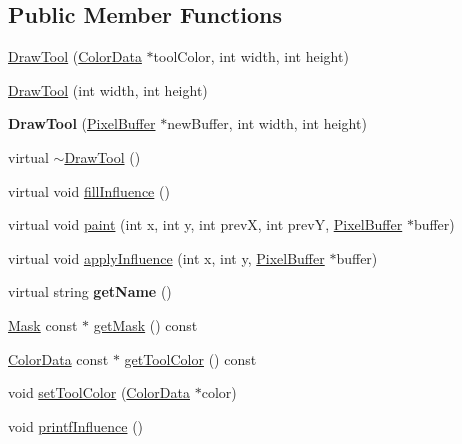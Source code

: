 \subsection*{Public Member Functions}
\begin{DoxyCompactItemize}
\item 
\hyperlink{classDrawTool_aa21e3a5373ba9e4e43d6e56eec82b32d}{Draw\-Tool} (\hyperlink{classColorData}{Color\-Data} $\ast$tool\-Color, int width, int height)
\item 
\hyperlink{classDrawTool_aa1816d6699a835d9c7619ee5c97be9d1}{Draw\-Tool} (int width, int height)
\item 
\hypertarget{classDrawTool_a521ad2f183dd3354de1dd163140e8b1d}{{\bfseries Draw\-Tool} (\hyperlink{classPixelBuffer}{Pixel\-Buffer} $\ast$new\-Buffer, int width, int height)}\label{classDrawTool_a521ad2f183dd3354de1dd163140e8b1d}

\item 
virtual \hyperlink{classDrawTool_ac07eb21dc6dfc99b7e3e7a6e3b9548f3}{$\sim$\-Draw\-Tool} ()
\item 
virtual void \hyperlink{classDrawTool_ae202bc193ba721452e81f34b6c2e6e35}{fill\-Influence} ()
\item 
virtual void \hyperlink{classDrawTool_a65dbb2f006efc9c6053d01df75eff5a9}{paint} (int x, int y, int prev\-X, int prev\-Y, \hyperlink{classPixelBuffer}{Pixel\-Buffer} $\ast$buffer)
\item 
virtual void \hyperlink{classDrawTool_ac60a70d91e81163d413b99382ac4255b}{apply\-Influence} (int x, int y, \hyperlink{classPixelBuffer}{Pixel\-Buffer} $\ast$buffer)
\item 
\hypertarget{classDrawTool_a11a450d969098c86158b6ec5f14d291e}{virtual string {\bfseries get\-Name} ()}\label{classDrawTool_a11a450d969098c86158b6ec5f14d291e}

\item 
\hyperlink{classMask}{Mask} const $\ast$ \hyperlink{classDrawTool_ad11d4e44fcd2caf774e18ce5b2986865}{get\-Mask} () const 
\item 
\hyperlink{classColorData}{Color\-Data} const $\ast$ \hyperlink{classDrawTool_a00485271784acd5acc75840a7a17eb2e}{get\-Tool\-Color} () const 
\item 
void \hyperlink{classDrawTool_a7f7097be5f6beb7b3f6ce437785cac7a}{set\-Tool\-Color} (\hyperlink{classColorData}{Color\-Data} $\ast$color)
\item 
void \hyperlink{classDrawTool_a04f57381cb6c71d90a66e905b46f424c}{printf\-Influence} ()
\end{DoxyCompactItemize}
